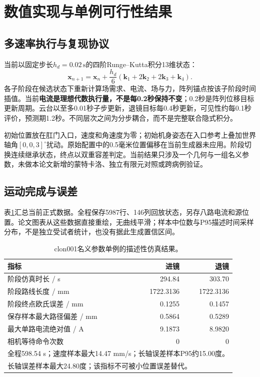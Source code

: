 \documentclass[UTF8,a4paper,zihao=5,fontset=windows]{ctexart}
\newcommand{\vect}[1]{\bm{#1}}
\newcommand{\unit}[1]{\,\mathrm{#1}}
\begin{document}
\section{数值实现与单例可行性结果}
\subsection{多速率执行与复现协议}
当前以固定步长$h_d=0.02\unit s$的四阶Runge--Kutta积分13维状态：
\begin{equation}
\vect x_{n+1}=\vect x_n+\frac{h_d}{6}(\vect k_1+2\vect k_2+2\vect k_3+\vect k_4).
\label{eq:rk4}
\end{equation}
各子阶段在候选状态下重新计算场需求、电流、场与力，阵列锚点按该子阶段时间插值。当前\textbf{电流是理想代数执行量，不是每0.2秒保持不变}；0.2秒是阵列位移目标更新周期。云台以至多0.01秒子步更新，退镜目标每0.4秒更新，可见性约每0.1秒评价，预测期1.2秒。不同层次之间为分步耦合，而不是完整联合隐式积分。

初始位置放在肛门入口，速度和角速度为零；初始机身姿态在入口参考上叠加世界轴角$[0,0,3]^\circ$扰动。原始配置中的0.5毫米位置偏移在当前生成器未应用。阶段切换连续继承状态，终点以双重容差判定。当前结果只涉及一个几何与一组名义参数，未做本论文新增的蒙特卡洛、独立有限元对照或跨病例验证。

\subsection{运动完成与误差}
表\ref{tab:results}汇总当前正式数据。全程保存5987行、146列回放状态，另存八路电流和源位置。论文图表从这些数据直接重绘，无曲线平滑；样本中位数与P95描述时间采样分布，不是独立受试者统计，也没有据此生成置信区间。
\begin{table}[htbp]
\centering\caption{clon001名义参数单例的描述性仿真结果。}\label{tab:results}
\begin{tabularx}{\linewidth}{Xrr}
\toprule 指标 & 进镜 & 退镜\\\midrule
阶段仿真时长 / s & 294.84 & 303.70\\
阶段路线长度 / mm & 1722.3136 & 1722.3136\\
阶段终点欧氏误差 / mm & 0.1255 & 0.1457\\
保存样本最大路径偏差 / mm & 0.5864 & 0.5289\\
最大单路电流绝对值 / A & 9.1873 & 8.9820\\
相机等待命令次数 & 0 & 0\\\midrule
\multicolumn{3}{l}{全程598.54 s；速度样本最大14.47 mm/s；长轴误差样本P95约15.00度。}\\
\multicolumn{3}{l}{长轴误差样本最大24.80度；该指标不可被小位置误差替代。}\\
\bottomrule\end{tabularx}
\end{table}
\end{document}
